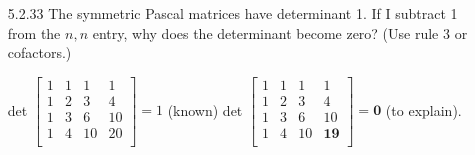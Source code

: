 \documentclass[10pt,twoside,reqno]{article}
\begin{document}
\begin{enumerate}
\vspace{3mm}

\item[5.2.33] The symmetric Pascal matrices have determinant 1. If I subtract 1 from the $n, n$ entry, why does the determinant become zero? (Use rule 3 or cofactors.) \\
\begin{center}
det
$
\begin{bmatrix}
1&1&1&1\\
1&2&3&4\\
1&3&6&10\\
1&4&10&20\\
\end{bmatrix}
=1
$
 (known)
\hspace{12mm}
det
$
\begin{bmatrix}
1&1&1&1\\
1&2&3&4\\
1&3&6&10\\
1&4&10&\textbf{19}\\
\end{bmatrix}
=\textbf{0}
$
 (to explain). \\
\end{center}
\vspace{3mm}



\vspace{3mm}
\end{enumerate}
\end{document}
